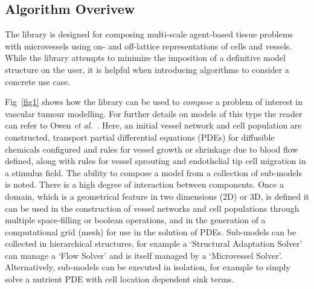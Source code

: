 \documentclass[10pt,letterpaper]{article}
\begin{document}
\subsection*{Algorithm Overivew}

The library is designed for composing multi-scale agent-based tissue problems with microvessels using on- and off-lattice representations of cells and vessels. While the library attempts to minimize the imposition of a definitive model structure on the user, it is helpful when introducing algorithms to consider a concrete use case. 

Fig~\ref{fig1} shows how the library can be used to \emph{compose} a problem of interest in vascular tumour modelling. For further details on models of this type the reader can refer to Owen \emph{et al.}~\cite{Owen2011}. Here, an initial vessel network and cell population are constructed, transport partial differential equations (PDEs) for diffusible chemicals configured and rules for vessel growth or shrinkage due to blood flow defined, along with rules for vessel sprouting and endothelial tip cell migration in a stimulus field. The ability to compose a model from a collection of sub-models is noted. There is a high degree of interaction between components. Once a domain, which is a geometrical feature in two dimensions (2D) or 3D, is defined it can be used in the construction of vessel networks and cell populations through multiple space-filling or boolean operations, and in the generation of a computational grid (mesh) for use in the solution of PDEs. Sub-models can be collected in hierarchical structures, for example a `Structural Adaptation Solver' can manage a `Flow Solver' and is itself managed by a `Microvessel Solver'. Alternatively, sub-models can be executed in isolation, for example to simply solve a nutrient PDE with cell location dependent sink terms.
\end{document}
